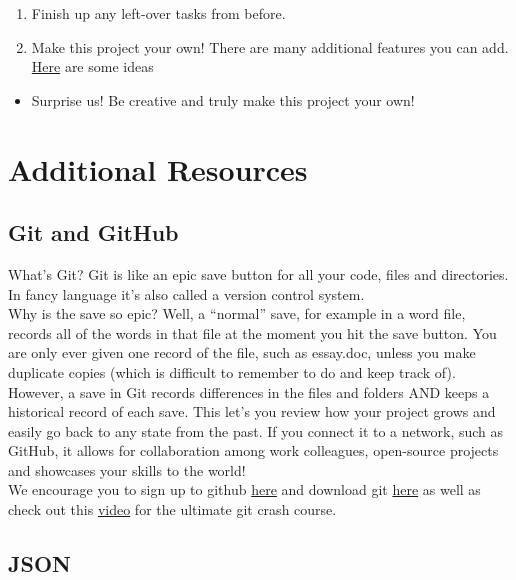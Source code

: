 \documentclass[
]{article}
\providecommand{\tightlist}{%
  \setlength{\itemsep}{0pt}\setlength{\parskip}{0pt}}
\begin{document}
\begin{enumerate}
\def\labelenumi{\arabic{enumi}.}
\tightlist
\item
  Finish up any left-over tasks from before.
\item
  Make this project your own! There are many additional features you can add. \protect\hyperlink{more-ideas}{Here} are some ideas
\end{enumerate}

\begin{itemize}
\tightlist
\item
  Surprise us! Be creative and truly make this project your own!
\end{itemize}

\hypertarget{additional-resources}{%
\section{Additional Resources}\label{additional-resources}}

\hypertarget{git-and-github}{%
\subsection{Git and GitHub}\label{git-and-github}}

What's Git? Git is like an epic save button for all your code, files and directories. In fancy language it's also called a version control system.\\
Why is the save so epic? Well, a ``normal'' save, for example in a word file, records all of the words in that file at the moment you hit the save button. You are only ever given one record of the file, such as essay.doc, unless you make duplicate copies (which is difficult to remember to do and keep track of).\\
However, a save in Git records differences in the files and folders AND keeps a historical record of each save. This let's you review how your project grows and easily go back to any state from the past. If you connect it to a network, such as GitHub, it allows for collaboration among work colleagues, open-source projects and showcases your skills to the world!\\
We encourage you to sign up to github \href{https://github.com/}{here} and download git \href{https://git-scm.com/downloads}{here} as well as check out this \href{https://www.youtube.com/watch?v=SWYqp7iY_Tc}{video} for the ultimate git crash course.

\hypertarget{json}{%
\subsection{JSON}\label{json}}
\end{document}
